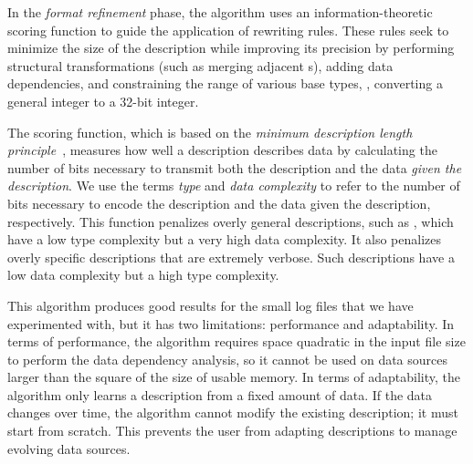 In the {\em format refinement} phase,
the algorithm uses an information-theoretic scoring function to guide the
application of rewriting rules.
These rules seek to minimize the size of the description while
improving its precision by performing structural transformations (such
as merging adjacent s),  adding data dependencies, and
constraining the range of various base types, \eg{}, converting a
general integer to a 32-bit integer.  

The scoring function, which is based on the \textit{minimum
  description length principle}~\cite{mdlbook}, 
measures how well a description describes data by calculating
the number of bits necessary to transmit both the description and the
data \textit{given the description}.  We use the terms \textit{type}
  and \textit{data complexity} to refer to the number of bits necessary to
encode the description and the data given the description,
respectively.  This function penalizes overly
general descriptions, such as , which have a
low type complexity but a very high data complexity.  It also
penalizes overly specific descriptions that are extremely verbose.
Such descriptions have a low data complexity but a high type 
complexity.


This algorithm produces good results for the small
log files that we have experimented with, but it has two limitations:
performance and adaptability.  In terms of performance, the algorithm
requires space quadratic in the input file size to perform the data
dependency analysis, so it cannot be used on data sources larger than the
square of the size of usable memory. In terms of adaptability, the
algorithm only learns a description from a fixed amount of data.
If the data changes over time,
the algorithm cannot modify the existing description; 
it must start from scratch. This prevents the user from adapting
descriptions to manage evolving data sources.


%
%
%
%
